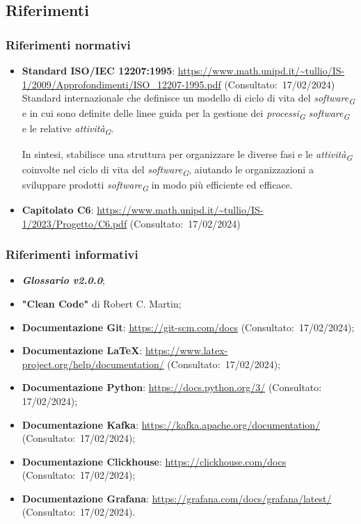 \subsection{Riferimenti}
\subsubsection{Riferimenti normativi}
\begin{itemize}
    \item \textbf{Standard ISO/IEC 12207:1995}: \url{https://www.math.unipd.it/~tullio/IS-1/2009/Approfondimenti/ISO_12207-1995.pdf} (Consultato:~17/02/2024) \\
    Standard internazionale che definisce un modello di ciclo di vita del \textit{software}\textsubscript{\textit{G}} e in cui sono definite delle linee guida per la gestione dei \textit{processi}\textsubscript{\textit{G}} \textit{software}\textsubscript{\textit{G}} e le relative \textit{attività}\textsubscript{\textit{G}}.
    
    In sintesi, stabilisce una struttura per organizzare le diverse fasi e le \textit{attività}\textsubscript{\textit{G}} coinvolte nel ciclo di vita del \textit{software}\textsubscript{\textit{G}}, aiutando le organizzazioni a sviluppare prodotti \textit{software}\textsubscript{\textit{G}} in modo più efficiente ed efficace.

    \item \textbf{Capitolato C6}: \url{https://www.math.unipd.it/~tullio/IS-1/2023/Progetto/C6.pdf} (Consultato:~17/02/2024)

\end{itemize}

\subsubsection{Riferimenti informativi}
\begin{itemize}
    \item \textbf{\textit{Glossario v2.0.0}};
    \item \textbf{"Clean Code"} di Robert C. Martin;
    \item \textbf{Documentazione Git}: \url{https://git-scm.com/docs} (Consultato:~17/02/2024);
    \item \textbf{Documentazione \LaTeX}: \url{https://www.latex-project.org/help/documentation/} (Consultato:~17/02/2024);
    \item \textbf{Documentazione Python}: \url{https://docs.python.org/3/} (Consultato: 17/02/2024);
    \item \textbf{Documentazione Kafka}: \url{https://kafka.apache.org/documentation/} (Consultato:~17/02/2024);
    \item \textbf{Documentazione Clickhouse}: \url{https://clickhouse.com/docs} (Consultato:~17/02/2024);
    \item \textbf{Documentazione Grafana}: \url{https://grafana.com/docs/grafana/latest/} (Consultato:~17/02/2024).
\end{itemize}

